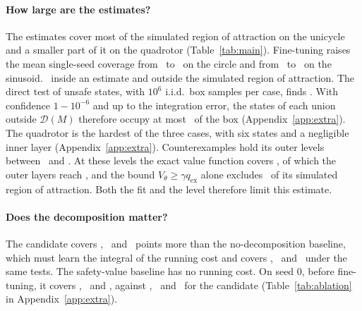 \documentclass{l4dc2027}
\newcommand{\D}{\mathcal D}
\newcommand{\qex}{q_{\mathrm{ex}}}
\begin{document}
\vspace{-0.075in}

\paragraph{How large are the estimates?} The estimates cover most of the simulated region of attraction on the unicycle and a smaller part of it on the quadrotor (Table~\ref{tab:main}). Fine-tuning raises the mean single-seed coverage from \resRawCircMean\ to \resCovCircMean\ on the circle and from \resRawSinMean\ to \resCovSinMean\ on the sinusoid. \resFPSentence\ inside an estimate and outside the simulated region of attraction. The direct test of unsafe states, with $10^6$ i.i.d.\ box samples per case, finds \resUnsafeKPhrase. With confidence $1-10^{-6}$ and up to the integration error, the states of each union outside $\D(M)$ therefore occupy at most \resUnsafeEpsMax\ of the box (Appendix~\ref{app:extra}). The quadrotor is the hardest of the three cases, with six states and a negligible inner layer (Appendix~\ref{app:extra}). Counterexamples hold its outer levels between \resCtwoMinQuad\ and \resCtwoMaxQuad. At these levels the exact value function covers \resCeilQuad, of which the outer layers reach \resCeilFracQuad, and the bound $V_\theta\ge\gamma\qex$ alone excludes \resFloorQuad\ of its simulated region of attraction. Both the fit and the level therefore limit this estimate.

\vspace{-0.075in}

\paragraph{Does the decomposition matter?} The candidate covers \resGapCirc, \resGapSin\ and \resGapQuad\ points more than the no-decomposition baseline, which must learn the integral of the running cost and covers \resWholeCirc, \resWholeSin\ and \resWholeQuad\ under the same tests. The safety-value baseline has no running cost. On seed 0, before fine-tuning, it covers \resSafetyCirc, \resSafetySin\ and \resSafetyQuad, against \resSeedZeroCirc, \resSeedZeroSin\ and \resSeedZeroQuad\ for the candidate (Table~\ref{tab:ablation} in Appendix~\ref{app:extra}).

\vspace{-0.075in}
\end{document}
